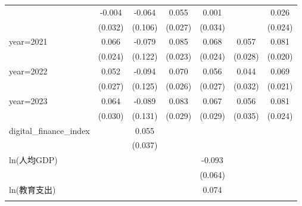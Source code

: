 \begin{table}[htbp]
\begin{tabular}{l*{6}{c}}
{\addlinespace
year=2020           &      -0.004         &      -0.064         &       0.055\sym{*}  &       0.001         &                     &       0.026         \\
                    &     (0.032)         &     (0.106)         &     (0.027)         &     (0.034)         &                     &     (0.024)         \\
\addlinespace
year=2021           &       0.066\sym{***}&      -0.079         &       0.085\sym{***}&       0.068\sym{***}&       0.057\sym{*}  &       0.081\sym{***}\\
                    &     (0.024)         &     (0.122)         &     (0.023)         &     (0.024)         &     (0.028)         &     (0.020)         \\
\addlinespace
year=2022           &       0.052\sym{*}  &      -0.094         &       0.070\sym{**} &       0.056\sym{**} &       0.044         &       0.069\sym{***}\\
                    &     (0.027)         &     (0.125)         &     (0.026)         &     (0.027)         &     (0.032)         &     (0.021)         \\
\addlinespace
year=2023           &       0.064\sym{**} &      -0.089         &       0.083\sym{***}&       0.067\sym{**} &       0.056         &       0.081\sym{***}\\
                    &     (0.030)         &     (0.131)         &     (0.029)         &     (0.029)         &     (0.035)         &     (0.024)         \\
\addlinespace
digital\_finance\_index&                     &       0.055         &                     &                     &                     &                     \\
                    &                     &     (0.037)         &                     &                     &                     &                     \\
\addlinespace
ln(人均GDP)         &                     &                     &                     &      -0.093         &                     &                     \\
                    &                     &                     &                     &     (0.064)         &                     &                     \\
\addlinespace
ln(教育支出)        &                     &                     &                     &       0.074         &                     &                     \\
}
\end{tabular}
\end{table}
